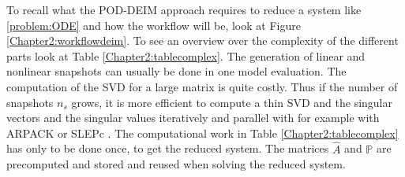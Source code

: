 To recall what the POD-DEIM approach requires to reduce a system like \eqref{problem:ODE} and how the workflow will be, look at Figure \ref{Chapter2:workflowdeim}. To see an overview over the complexity of the different parts look at Table \ref{Chapter2:tablecomplex}.
The generation of linear and nonlinear snapshots can usually be done in one model evaluation. The computation of the SVD for a large matrix is quite costly. Thus if the number of snapshots $n_s$ grows, it is more efficient to compute
a thin SVD and the singular vectors and the singular values iteratively and parallel with for example with ARPACK \cite{arpack} or SLEPc \cite{slepc-toms}. 
The computational work in Table \ref{Chapter2:tablecomplex} has only to be done once, to get the reduced system. The matrices $\hat{A}$ and  $\mathbb{P}$ are precomputed and stored and reused 
when solving the reduced system. 
